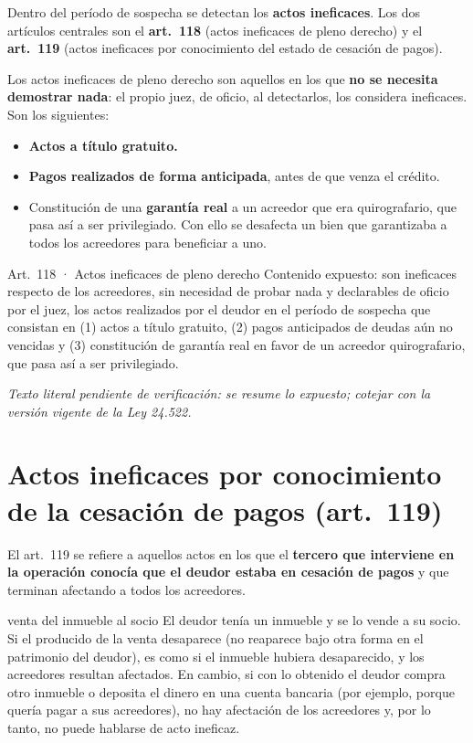 \documentclass[12pt,oneside]{book}
\begin{document}
Dentro del período de sospecha se detectan los \textbf{actos ineficaces}. Los dos artículos centrales son el \textbf{art.~118} (actos ineficaces de pleno derecho) y el \textbf{art.~119} (actos ineficaces por conocimiento del estado de cesación de pagos).

Los actos ineficaces de pleno derecho son aquellos en los que \textbf{no se necesita demostrar nada}: el propio juez, de oficio, al detectarlos, los considera ineficaces. Son los siguientes:

\begin{itemize}
    \item \textbf{Actos a título gratuito.}
    \item \textbf{Pagos realizados de forma anticipada}, antes de que venza el crédito.
    \item Constitución de una \textbf{garantía real} a un acreedor que era quirografario, que pasa así a ser privilegiado. Con ello se desafecta un bien que garantizaba a todos los acreedores para beneficiar a uno.
\end{itemize}

\begin{norma}{Art.~118 · Actos ineficaces de pleno derecho}
Contenido expuesto: son ineficaces respecto de los acreedores, sin necesidad de probar nada y declarables de oficio por el juez, los actos realizados por el deudor en el período de sospecha que consistan en (1) actos a título gratuito, (2) pagos anticipados de deudas aún no vencidas y (3) constitución de garantía real en favor de un acreedor quirografario, que pasa así a ser privilegiado.

\par\smallskip\textit{Texto literal pendiente de verificación: se resume lo expuesto; cotejar con la versión vigente de la Ley 24.522.}
\end{norma}

\section{Actos ineficaces por conocimiento de la cesación de pagos (art.~119)}

El art.~119 se refiere a aquellos actos en los que el \textbf{tercero que interviene en la operación conocía que el deudor estaba en cesación de pagos} y que terminan afectando a todos los acreedores.

\begin{example}{venta del inmueble al socio}
El deudor tenía un inmueble y se lo vende a su socio. Si el producido de la venta desaparece (no reaparece bajo otra forma en el patrimonio del deudor), es como si el inmueble hubiera desaparecido, y los acreedores resultan afectados. En cambio, si con lo obtenido el deudor compra otro inmueble o deposita el dinero en una cuenta bancaria (por ejemplo, porque quería pagar a sus acreedores), no hay afectación de los acreedores y, por lo tanto, no puede hablarse de acto ineficaz.
\end{example}
\end{document}
